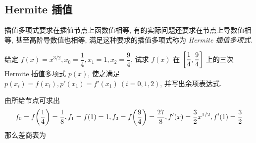 \subsection{Hermite 插值}

插值多项式要求在插值节点上函数值相等, 有的实际问题还要求在节点上导数值相等, 甚至高阶导数值也相等, 满足这种要求的插值多项式称为 \textit{Hermite 插值多项式}.

\begin{example}
    给定 $f(x)=x^{3/2},x_0=\dfrac{1}{4},x_1=1,x_2=\dfrac{9}{4}$, \label{fxx32x014}试求 $f(x)$ 在 $\qty[\dfrac{1}{4},\dfrac{9}{4}]$ 上的三次 Hermite 插值多项式 $p(x)$, 使之满足
    $p(x_i)=f(x_i),p'(x_1)=f'(x_1)~ (i=0,1,2)$, 并写出余项表达式.
\end{example}
\begin{solution}
    由所给节点可求出 $$f_0=f\qty(\dfrac{1}{4})=\dfrac{1}{8},f_1=f(1)=1,f_2=f\qty(\dfrac{9}{4})=\dfrac{27}{8},f'(x)=\dfrac{3}{2}x^{1/2},f'(1)=\dfrac{3}{2}$$
    那么差商表为
    \begin{table}[H]
        \centering
    \end{table}

\end{solution}
